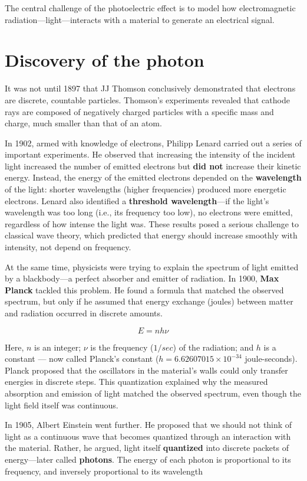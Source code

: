 \documentclass[
  letterpaper,
]{book}
\begin{document}
The central challenge of the photoelectric effect is to model how
electromagnetic radiation---light---interacts with a material to
generate an electrical signal.

\section{Discovery of the photon}\label{sec-photon-discovered}

It was not until 1897 that JJ Thomson conclusively demonstrated that
electrons are discrete, countable particles. Thomson's experiments
revealed that cathode rays are composed of negatively charged particles
with a specific mass and charge, much smaller than that of an atom.

In 1902, armed with knowledge of electrons, Philipp Lenard carried out a
series of important experiments. He observed that increasing the
intensity of the incident light increased the number of emitted
electrons but \textbf{did not} increase their kinetic energy. Instead,
the energy of the emitted electrons depended on the \textbf{wavelength}
of the light: shorter wavelengths (higher frequencies) produced more
energetic electrons. Lenard also identified a \textbf{threshold
wavelength}---if the light's wavelength was too long (i.e., its
frequency too low), no electrons were emitted, regardless of how intense
the light was. These results posed a serious challenge to classical wave
theory, which predicted that energy should increase smoothly with
intensity, not depend on frequency.

At the same time, physicists were trying to explain the spectrum of
light emitted by a blackbody---a perfect absorber and emitter of
radiation. In 1900, \textbf{Max Planck} tackled this problem. He found a
formula that matched the observed spectrum, but only if he assumed that
energy exchange (joules) between matter and radiation occurred in
discrete amounts.

\[
E = n h \nu
\]

Here, \(n\) is an integer; \(\nu\) is the frequency (\(1/sec\)) of the
radiation; and \(h\) is a constant --- now called Planck's constant
(\(h = 6.62607015 \times 10^{-34}\) joule-seconds). Planck proposed that
the oscillators in the material's walls could only transfer energies in
discrete steps. This quantization explained why the measured absorption
and emission of light matched the observed spectrum, even though the
light field itself was continuous.

In 1905, Albert Einstein went further. He proposed that we should not
think of light as a continuous wave that becomes quantized through an
interaction with the material. Rather, he argued, light itself
\textbf{quantized} into discrete packets of energy---later called
\textbf{photons}. The energy of each photon is proportional to its
frequency, and inversely proportional to its wavelength
\end{document}
